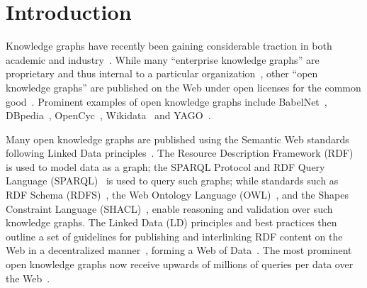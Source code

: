 \documentclass[sw]{iosart2x}
\begin{document}

\section{Introduction}\label{Introduction}


Knowledge graphs have recently been gaining considerable traction in both academic and industry~\cite{NoyGJNPT19}. While many ``enterprise knowledge graphs'' are proprietary and thus internal to a particular organization~\cite{NoyGJNPT19}, other ``open knowledge graphs'' are published on the Web under open licenses for the common good~\cite{FarberBMR18}. Prominent examples of open knowledge graphs include BabelNet~\cite{NavigliP12}, DBpedia~\cite{dbpedia}, OpenCyc~\cite{FarberBMR18}, Wikidata~\cite{VrandecicK14} and YAGO~\cite{HoffartSBW13}. 

Many open knowledge graphs are published using the Semantic Web standards following Linked Data principles~\cite{FarberBMR18,MalyshevKGGB18}. The Resource Description Framework (RDF)~\cite{rdfconcepts11} is used to model data as a graph; the SPARQL Protocol and RDF Query Language (SPARQL)~\cite{sparql11} is used to query such graphs; while standards such as RDF Schema (RDFS)~\cite{rdfschema11}, the Web Ontology Language (OWL)~\cite{owl2primer}, and the Shapes Constraint Language (SHACL)~\cite{shacl}, enable reasoning and validation over such knowledge graphs. The Linked Data (LD) principles and best practices then outline a set of guidelines for publishing and interlinking RDF content on the Web in a decentralized manner~\cite{ldbook}, forming a Web of Data~\cite{wodbook}. The most prominent open knowledge graphs now receive upwards of millions of queries per data over the Web~\cite{SaleemAHMN15,MalyshevKGGB18}.

\end{document}
